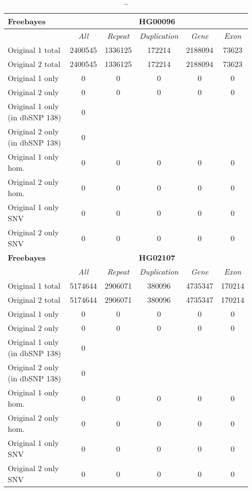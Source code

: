 \begin{table}[htb]
\begin{center}
\begin{tabular}{|l|c||c|c|c|c|}
\hline
{\bf Freebayes} & \multicolumn{5}{|c|}{\bf HG00096} \\
\hline
\cline{2-6}
{\bf} & {\it All} & {\it Repeat} & {\it Duplication} & {\it Gene} & {\it Exon} \\
\hline
Original 1 total & 2400545 & 1336125 & 172214 & 2188094 & 73623\\ 
\hline
Original 2 total & 2400545 & 1336125 & 172214 & 2188094 & 73623\\ 
\hline
Original 1 only & 0 & 0 & 0 & 0 & 0\\ 
\hline
Original 2 only & 0 & 0 & 0 & 0 & 0\\ 
\hline
Original 1 only (in dbSNP 138) & 0 &  &  &  & \\ 
\hline
Original 2 only (in dbSNP 138) & 0 &  &  &  & \\ 
\hline
Original 1 only hom. & 0 & 0 & 0 & 0 & 0\\ 
\hline
Original 2 only hom. & 0 & 0 & 0 & 0 & 0\\ 
\hline
Original 1 only SNV & 0 & 0 & 0 & 0 & 0\\ 
\hline
Original 2 only SNV & 0 & 0 & 0 & 0 & 0\\ 
\hline
\hline
{\bf Freebayes} & \multicolumn{5}{|c|}{\bf HG02107} \\
\hline
\cline{2-6}
{\bf} & {\it All} & {\it Repeat} & {\it Duplication} & {\it Gene} & {\it Exon} \\
\hline
Original 1 total & 5174644 & 2906071 & 380096 & 4735347 & 170214\\ 
\hline
Original 2 total & 5174644 & 2906071 & 380096 & 4735347 & 170214\\ 
\hline
Original 1 only & 0 & 0 & 0 & 0 & 0\\ 
\hline
Original 2 only & 0 & 0 & 0 & 0 & 0\\ 
\hline
Original 1 only (in dbSNP 138) & 0 &  &  &  & \\ 
\hline
Original 2 only (in dbSNP 138) & 0 &  &  &  & \\ 
\hline
Original 1 only hom. & 0 & 0 & 0 & 0 & 0\\ 
\hline
Original 2 only hom. & 0 & 0 & 0 & 0 & 0\\ 
\hline
Original 1 only SNV & 0 & 0 & 0 & 0 & 0\\ 
\hline
Original 2 only SNV & 0 & 0 & 0 & 0 & 0\\ 
\hline
\end{tabular}
\end{center}
\caption{ .. }
\label{tab:orig-vs-orig2-freebayes}
\end{table}

